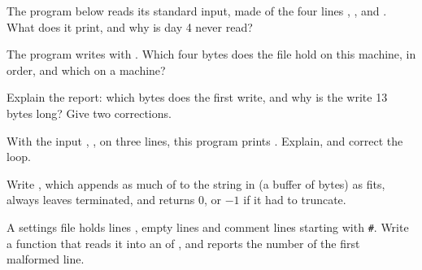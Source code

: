 \begin{exercise}[$\star$]\label{exo:b1:c-strings-structs-files:3}
The program below reads its standard input, made of the four lines , ,  and .
What does it print, and why is day 4 never read?
\end{exercise}

\begin{exercise}[$\star$]\label{exo:b1:c-strings-structs-files:4}
The program writes  with . Which four bytes does the file hold on this machine, in order,
and which on a  machine?
\end{exercise}

\begin{exercise}[$\star\star$]\label{exo:b1:c-strings-structs-files:5}
Explain the report: which bytes does the first  write, and why is the write 13 bytes long? Give two
corrections.
\end{exercise}

\begin{exercise}[$\star\star$]\label{exo:b1:c-strings-structs-files:6}
With the input , ,  on three lines, this program prints . Explain,
and correct the loop.
\end{exercise}

\begin{exercise}[$\star\star$]\label{exo:b1:c-strings-structs-files:7}
Write , which appends as much of  to the string
in  (a buffer of  bytes) as fits, always leaves  terminated, and returns 0, or $-1$ if it
had to truncate.
\end{exercise}

\begin{exercise}[$\star\star$]\label{exo:b1:c-strings-structs-files:8}
A settings file holds lines , empty lines and comment lines starting with \texttt{\#}. Write a function
that reads it into an  of , and reports the number of the
first malformed line.
\end{exercise}

